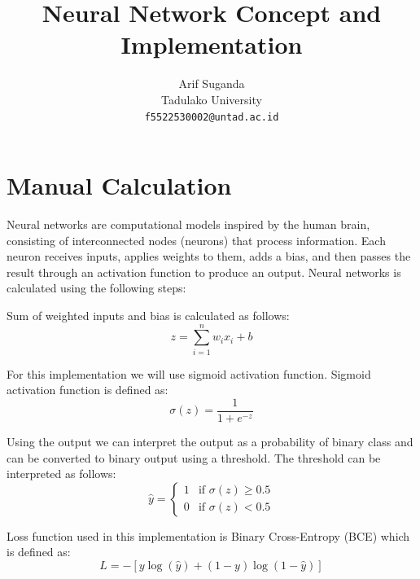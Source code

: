 \documentclass[a4paper,10pt]{article}
\title{Neural Network Concept and Implementation}
\author{Arif Suganda\\
        Tadulako University\\
        \texttt{f5522530002@untad.ac.id}
}
\begin{document}
\maketitle

\section{Manual Calculation}

Neural networks are computational models inspired by the human brain, consisting of interconnected nodes (neurons) that process information. 
Each neuron receives inputs, applies weights to them, adds a bias, and then passes the result through an activation function to produce an output.
Neural networks is calculated using the following steps:

Sum of weighted inputs and bias is calculated as follows:
\begin{equation}\label{eq:sum_weight_bias}
    z = \sum_{i=1}^{n} w_i x_i + b
\end{equation}

For this implementation we will use sigmoid activation function. Sigmoid activation function is defined as:
\begin{equation}\label{eq:sigmoid}
    \sigma(z) = \frac{1}{1 + e^{-z}}
\end{equation}

Using the output we can interpret the output as a probability of binary class and can be converted to binary output using a threshold.
The threshold can be interpreted as follows:
\begin{equation}\label{eq:threshold}
    \hat{y} = \begin{cases}
        1 & \text{if } \sigma(z) \ge 0.5 \\
        0 & \text{if } \sigma(z) < 0.5
    \end{cases}
\end{equation}

Loss function used in this implementation is Binary Cross-Entropy (BCE) which is defined as:
\begin{equation}\label{eq:bce_loss}
    L = -\left[ y \log(\hat{y}) + (1 - y) \log(1 - \hat{y}) \right]
\end{equation}
\end{document}
